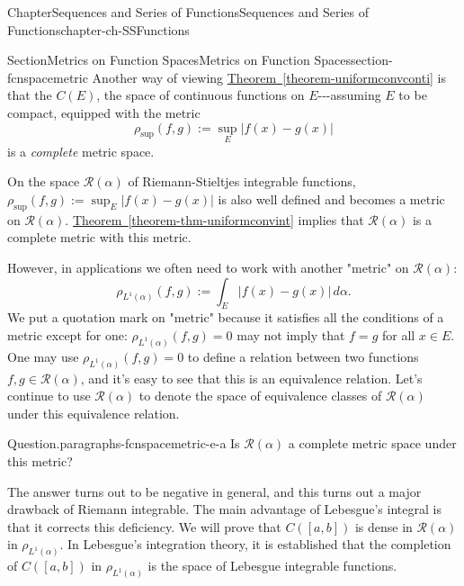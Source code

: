\documentclass[oneside,10pt,]{book}
\newcommand{\xreffont}{\relax}
\numberwithin{equation}{section}
\begin{document}
\begin{chapterptx}{Chapter}{Sequences and Series of Functions}{}{Sequences and Series of Functions}{}{}{chapter-ch-SSFunctions}
\typeout{************************************************}
%
\begin{sectionptx}{Section}{Metrics on Function Spaces}{}{Metrics on Function Spaces}{}{}{section-fcnspacemetric}
Another way of viewing  \hyperref[theorem-uniformconvconti]{Theorem~{\xreffont\ref{theorem-uniformconvconti}}} is that the \(C(E)\), the space of continuous functions on \(E\)-{}-{}-assuming \(E\) to be compact, equipped with the metric%
\begin{equation*}
\rho_{\text{sup}}(f, g) :=\sup_{E}|f(x)-g(x)|
\end{equation*}
is a \emph{complete} metric space.%
\par
On the space \(\mathcal R (\alpha)\) of Riemann-Stieltjes integrable functions, \(\rho_{\text{sup}}(f, g) :=\sup_{E}|f(x)-g(x)|\) is also well defined and becomes a metric on \(\mathcal R (\alpha)\). \hyperref[theorem-thm-uniformconvint]{Theorem~{\xreffont\ref{theorem-thm-uniformconvint}}} implies that \(\mathcal R (\alpha)\) is a complete metric with this metric.%
\par
However,  in applications  we often need to work with another "metric" on \(\mathcal R (\alpha)\):%
\begin{equation*}
\rho_{L^{1}(\alpha)}(f, g) :=\int_{E}|f(x)-g(x)|\, d\alpha.
\end{equation*}
We put a quotation mark on "metric" because it satisfies all the conditions of a metric except for one: \(\rho_{L^{1}(\alpha)}(f, g)=0\) may not imply that \(f=g\) for all \(x\in E\). One may use \(\rho_{L^{1}(\alpha)}(f, g)=0\) to define a relation between two functions \(f, g\in \mathcal R (\alpha)\), and it's easy to see that this is an equivalence relation. Let's continue to use \(\mathcal R (\alpha)\) to denote the space of equivalence classes of \(\mathcal R (\alpha)\) under this equivalence relation.%
\par
\begin{paragraphs}{Question.}{paragraphs-fcnspacemetric-e-a}%
 Is \(\mathcal R (\alpha)\) a complete metric space under this metric?\end{paragraphs}%
%
\par
The answer turns out to be negative in general, and this turns out a major drawback of Riemann integrable. The main advantage of Lebesgue's integral is that it corrects this deficiency. We will prove that \(C([a,b])\) is dense in \(\mathcal R (\alpha)\) in \(\rho_{L^{1}(\alpha)}\). In Lebesgue's integration theory, it is established that the completion of \(C([a,b])\) in \(\rho_{L^{1}(\alpha)}\)  is the space of Lebesgue integrable functions.%

\end{sectionptx}
\end{chapterptx}
\end{document}
